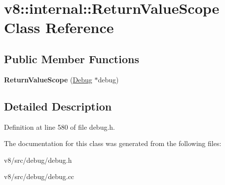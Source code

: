 \hypertarget{classv8_1_1internal_1_1ReturnValueScope}{}\section{v8\+:\+:internal\+:\+:Return\+Value\+Scope Class Reference}
\label{classv8_1_1internal_1_1ReturnValueScope}
\subsection*{Public Member Functions}
\begin{DoxyCompactItemize}
\item 
\mbox{\label{classv8_1_1internal_1_1ReturnValueScope_a067521053e4a003dde0ac76ac595f5a6}} 
{\bfseries Return\+Value\+Scope} (\mbox{\hyperlink{classv8_1_1internal_1_1Debug}{Debug}} $\ast$debug)
\end{DoxyCompactItemize}


\subsection{Detailed Description}


Definition at line 580 of file debug.\+h.



The documentation for this class was generated from the following files\+:\begin{DoxyCompactItemize}
\item 
v8/src/debug/debug.\+h\item 
v8/src/debug/debug.\+cc\end{DoxyCompactItemize}
